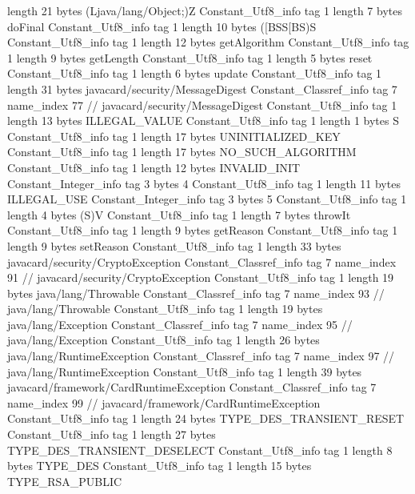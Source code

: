 {{{			length	21
			bytes	(Ljava/lang/Object;)Z
		}
		Constant_Utf8_info {
			tag	1
			length	7
			bytes	doFinal
		}
		Constant_Utf8_info {
			tag	1
			length	10
			bytes	([BSS[BS)S
		}
		Constant_Utf8_info {
			tag	1
			length	12
			bytes	getAlgorithm
		}
		Constant_Utf8_info {
			tag	1
			length	9
			bytes	getLength
		}
		Constant_Utf8_info {
			tag	1
			length	5
			bytes	reset
		}
		Constant_Utf8_info {
			tag	1
			length	6
			bytes	update
		}
		Constant_Utf8_info {
			tag	1
			length	31
			bytes	javacard/security/MessageDigest
		}
		Constant_Classref_info {
			tag	7
			name_index	77		// javacard/security/MessageDigest
		}
		Constant_Utf8_info {
			tag	1
			length	13
			bytes	ILLEGAL_VALUE
		}
		Constant_Utf8_info {
			tag	1
			length	1
			bytes	S
		}
		Constant_Utf8_info {
			tag	1
			length	17
			bytes	UNINITIALIZED_KEY
		}
		Constant_Utf8_info {
			tag	1
			length	17
			bytes	NO_SUCH_ALGORITHM
		}
		Constant_Utf8_info {
			tag	1
			length	12
			bytes	INVALID_INIT
		}
		Constant_Integer_info {
			tag	3
			bytes	4
		}
		Constant_Utf8_info {
			tag	1
			length	11
			bytes	ILLEGAL_USE
		}
		Constant_Integer_info {
			tag	3
			bytes	5
		}
		Constant_Utf8_info {
			tag	1
			length	4
			bytes	(S)V
		}
		Constant_Utf8_info {
			tag	1
			length	7
			bytes	throwIt
		}
		Constant_Utf8_info {
			tag	1
			length	9
			bytes	getReason
		}
		Constant_Utf8_info {
			tag	1
			length	9
			bytes	setReason
		}
		Constant_Utf8_info {
			tag	1
			length	33
			bytes	javacard/security/CryptoException
		}
		Constant_Classref_info {
			tag	7
			name_index	91		// javacard/security/CryptoException
		}
		Constant_Utf8_info {
			tag	1
			length	19
			bytes	java/lang/Throwable
		}
		Constant_Classref_info {
			tag	7
			name_index	93		// java/lang/Throwable
		}
		Constant_Utf8_info {
			tag	1
			length	19
			bytes	java/lang/Exception
		}
		Constant_Classref_info {
			tag	7
			name_index	95		// java/lang/Exception
		}
		Constant_Utf8_info {
			tag	1
			length	26
			bytes	java/lang/RuntimeException
		}
		Constant_Classref_info {
			tag	7
			name_index	97		// java/lang/RuntimeException
		}
		Constant_Utf8_info {
			tag	1
			length	39
			bytes	javacard/framework/CardRuntimeException
		}
		Constant_Classref_info {
			tag	7
			name_index	99		// javacard/framework/CardRuntimeException
		}
		Constant_Utf8_info {
			tag	1
			length	24
			bytes	TYPE_DES_TRANSIENT_RESET
		}
		Constant_Utf8_info {
			tag	1
			length	27
			bytes	TYPE_DES_TRANSIENT_DESELECT
		}
		Constant_Utf8_info {
			tag	1
			length	8
			bytes	TYPE_DES
		}
		Constant_Utf8_info {
			tag	1
			length	15
			bytes	TYPE_RSA_PUBLIC
		}
}}
